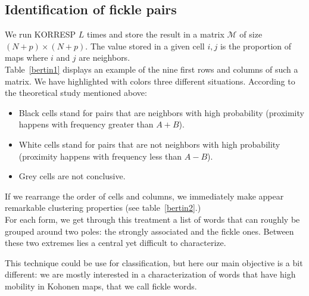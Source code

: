 \documentclass{elsarticle}
\begin{document}
\subsection{Identification of fickle pairs}

We run KORRESP $L$ times and store the result in a matrix $\mathcal{M}$ of size $(N+p)\times(N+p)$. The value stored in a given cell $i,j$ is the proportion of maps where $i$ and $j$ are neighbors.\\

Table~\ref{bertin1} displays an example of the nine first rows and columns of such a matrix. We have highlighted with colors three different situations. According to the theoretical study mentioned above:

\begin{itemize}
	\item Black cells stand for pairs that are neighbors with high probability (proximity happens with frequency greater than $A+B$).
	\item White cells stand for pairs that are not neighbors with high probability (proximity happens with frequency less than $A-B$).
	\item Grey cells are not conclusive.
\end{itemize}

If we rearrange the order of cells and columns, we immediately make appear remarkable clustering properties (see table~\ref{bertin2}.)\\

For each form, we get through this treatment a list of words that can roughly be grouped around two poles: the strongly associated and the fickle ones. Between these two extremes lies a central yet difficult to characterize.

This technique could be use for classification, but here our main objective is a bit different: we are mostly interested in a characterization of words that have high mobility in Kohonen maps, that we call fickle words.

\label{m1}
\end{document}
